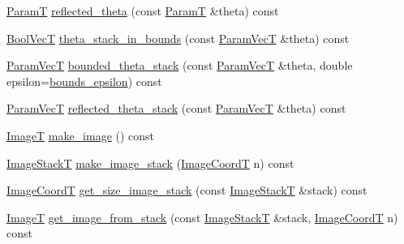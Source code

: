 \begin{DoxyCompactItemize}
\item 
\hyperlink{classmappel_1_1PointEmitterModel_a665ec6aea3aac139bb69a23c06d4b9a1}{ParamT} \hyperlink{classmappel_1_1PointEmitterModel_a7dd386776870462e8f20c646b6fed1e3}{reflected\+\_\+theta} (const \hyperlink{classmappel_1_1PointEmitterModel_a665ec6aea3aac139bb69a23c06d4b9a1}{ParamT} \&theta) const 
\item 
\hyperlink{namespacemappel_a167d761ecce3cafb6f98c00c16bdb523}{Bool\+VecT} \hyperlink{classmappel_1_1PointEmitterModel_a7b6a59b4bc796b440025cffb7a6159f8}{theta\+\_\+stack\+\_\+in\+\_\+bounds} (const \hyperlink{classmappel_1_1PointEmitterModel_add253b568d763f1513a810aac35de719}{Param\+VecT} \&theta) const 
\item 
\hyperlink{classmappel_1_1PointEmitterModel_add253b568d763f1513a810aac35de719}{Param\+VecT} \hyperlink{classmappel_1_1PointEmitterModel_a6671c06d391ae9a09dd5de78dcc636fe}{bounded\+\_\+theta\+\_\+stack} (const \hyperlink{classmappel_1_1PointEmitterModel_add253b568d763f1513a810aac35de719}{Param\+VecT} \&theta, double epsilon=\hyperlink{classmappel_1_1PointEmitterModel_ac987a119137b85a27704b1c40e3fab8c}{bounds\+\_\+epsilon}) const 
\item 
\hyperlink{classmappel_1_1PointEmitterModel_add253b568d763f1513a810aac35de719}{Param\+VecT} \hyperlink{classmappel_1_1PointEmitterModel_ae24c17017ff5e37e1dd9ea9a1aeefa7f}{reflected\+\_\+theta\+\_\+stack} (const \hyperlink{classmappel_1_1PointEmitterModel_add253b568d763f1513a810aac35de719}{Param\+VecT} \&theta) const 
\item 
\hyperlink{classmappel_1_1ImageFormat2DBase_a667ea5016648958e507e7db8eaa041b0}{ImageT} \hyperlink{classmappel_1_1ImageFormat2DBase_ab5d6c4f7f3818f4652fcf8d54351c981}{make\+\_\+image} () const 
\item 
\hyperlink{classmappel_1_1ImageFormat2DBase_a8f0276e94ff242fa4740a718642f5e14}{Image\+StackT} \hyperlink{classmappel_1_1ImageFormat2DBase_a76f8b347ce6c104973dec235398a4f32}{make\+\_\+image\+\_\+stack} (\hyperlink{classmappel_1_1ImageFormat2DBase_a45e9234d63c357f34ca56c72c12b9e9c}{Image\+CoordT} n) const 
\item 
\hyperlink{classmappel_1_1ImageFormat2DBase_a45e9234d63c357f34ca56c72c12b9e9c}{Image\+CoordT} \hyperlink{classmappel_1_1ImageFormat2DBase_a8ac2ce73a9b353b92a688224ccc4d217}{get\+\_\+size\+\_\+image\+\_\+stack} (const \hyperlink{classmappel_1_1ImageFormat2DBase_a8f0276e94ff242fa4740a718642f5e14}{Image\+StackT} \&stack) const 
\item 
\hyperlink{classmappel_1_1ImageFormat2DBase_a667ea5016648958e507e7db8eaa041b0}{ImageT} \hyperlink{classmappel_1_1ImageFormat2DBase_a22701571228f52dd6cfeac72ab18908c}{get\+\_\+image\+\_\+from\+\_\+stack} (const \hyperlink{classmappel_1_1ImageFormat2DBase_a8f0276e94ff242fa4740a718642f5e14}{Image\+StackT} \&stack, \hyperlink{classmappel_1_1ImageFormat2DBase_a45e9234d63c357f34ca56c72c12b9e9c}{Image\+CoordT} n) const 

\end{DoxyCompactItemize}
